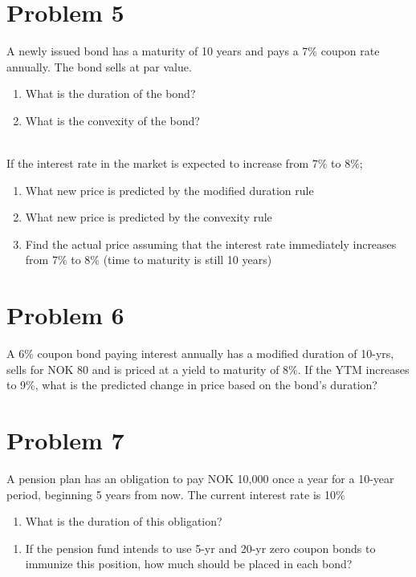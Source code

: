 \documentclass[12]{article}
\begin{document}
\color{black}
\section*{Problem 5}
A newly issued bond has a maturity of 10 years and pays a 7\% coupon rate annually. The bond sells at par value.
\begin{enumerate}
    \item[a)] What is the duration of the bond?
    \item[b)] What is the convexity of the bond?
\end{enumerate}

\noindent
\\
If the interest rate in the market is expected to increase from 7\% to 8\%;
\begin{enumerate}
    \item[c)] What new price is predicted by the modified duration rule 
    \item[d)] What new price is predicted by the convexity rule 
    \item[e)] Find the actual price assuming that the interest rate immediately increases from 7\% to 8\% (time to maturity is still  10 years) 
\end{enumerate}



\color{black}
\section*{Problem 6}
A 6\% coupon bond paying interest annually has a modified duration of 10-yrs, sells for NOK 80 and is priced at a yield to maturity of 8\%. If the YTM increases to 9\%, what is the predicted change in price based on the bond's duration?


\color{black}
\section*{Problem 7}
A pension plan has an obligation to pay NOK 10,000 once a year for a 10-year period, beginning 5 years from now. The current interest rate is 10\%
\begin{enumerate}
     \item[a)] What is the duration of this obligation? 
\end{enumerate}


\color{black}
\begin{enumerate}
     \item[b)] If the pension fund intends to use 5-yr and 20-yr zero coupon bonds to immunize this position, how much should be placed in each bond? 
\end{enumerate}
\end{document}
